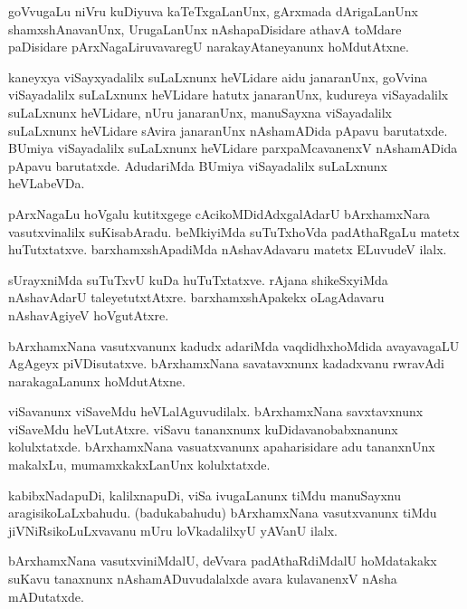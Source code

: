 \documentclass{article}
\begin{document}
\begin{mn}%
goVvugaLu niVru kuDiyuva kaTeTxgaLanUnx, gArxmada dArigaLanUnx shamxshAnavanUnx, UrugaLanUnx 
nAshapaDisidare athavA toMdare paDisidare pArxNagaLiruvavaregU narakayAtaneyanunx hoMdutAtxne.
\end{mn}

\begin{mn}%
kaneyxya viSayxyadalilx suLaLxnunx heVLidare aidu janaranUnx, goVvina viSayadalilx suLaLxnunx 
heVLidare hatutx janaranUnx, kudureya viSayadalilx suLaLxnunx heVLidare, nUru janaranUnx, 
manuSayxna viSayadalilx suLaLxnunx heVLidare sAvira janaranUnx nAshamADida pApavu barutatxde. 
BUmiya viSayadalilx suLaLxnunx heVLidare parxpaMcavanenxV nAshamADida pApavu barutatxde. 
AdudariMda BUmiya viSayadalilx suLaLxnunx heVLabeVDa.
\end{mn}

\begin{mn}%
pArxNagaLu hoVgalu kutitxgege cAcikoMDidAdxgalAdarU bArxhamxNara vasutxvinalilx suKisabAradu. 
beMkiyiMda suTuTxhoVda padAthaRgaLu matetx huTutxtatxve. barxhamxshApadiMda nAshavAdavaru matetx 
ELuvudeV ilalx.
\end{mn}

\begin{mn}%
sUrayxniMda suTuTxvU kuDa huTuTxtatxve. rAjana shikeSxyiMda nAshavAdarU taleyetutxtAtxre. 
barxhamxshApakekx oLagAdavaru nAshavAgiyeV hoVgutAtxre.
\end{mn}

\begin{mn}%
bArxhamxNana vasutxvanunx kadudx adariMda vaqdidhxhoMdida avayavagaLU AgAgeyx piVDisutatxve. 
bArxhamxNana savatavxnunx kadadxvanu rwravAdi narakagaLanunx hoMdutAtxne.
\end{mn}

\begin{mn}%
viSavanunx viSaveMdu heVLalAguvudilalx. bArxhamxNana savxtavxnunx viSaveMdu heVLutAtxre. viSavu 
tananxnunx kuDidavanobabxnanunx kolulxtatxde. bArxhamxNana vasuatxvanunx apaharisidare adu 
tananxnUnx makalxLu, mumamxkakxLanUnx kolulxtatxde.
\end{mn}

\begin{mn}%
kabibxNadapuDi, kalilxnapuDi, viSa ivugaLanunx tiMdu manuSayxnu aragisikoLaLxbahudu. (badukabahudu) 
bArxhamxNana vasutxvanunx tiMdu jiVNiRsikoLuLxvavanu mUru loVkadalilxyU yAVanU ilalx.
\end{mn}

\begin{mn}%
bArxhamxNana vasutxviniMdalU, deVvara padAthaRdiMdalU hoMdatakakx suKavu tanaxnunx 
nAshamADuvudalalxde avara kulavanenxV nAsha mADutatxde.
\end{mn}
\end{document}
